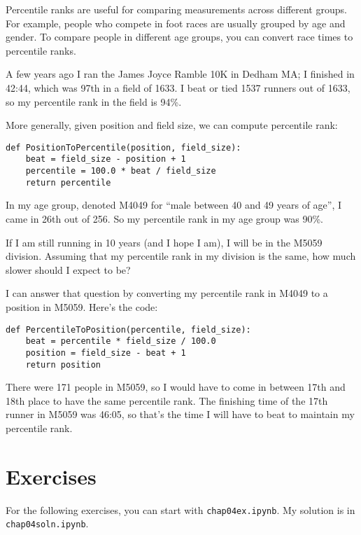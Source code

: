 Percentile ranks are useful for comparing measurements across
different groups.  For example, people who compete in foot races are
usually grouped by age and gender.  To compare people in different
age groups, you can convert race times to percentile ranks.

A few years ago I ran the James Joyce Ramble 10K in
Dedham MA; I finished in 42:44, which was 97th in a field of 1633.  I beat or
tied 1537 runners out of 1633, so my percentile rank in the field is
94\%.   

More generally, given position and field size, we can compute
percentile rank:

\begin{verbatim}
def PositionToPercentile(position, field_size):
    beat = field_size - position + 1
    percentile = 100.0 * beat / field_size
    return percentile
\end{verbatim}

In my age group, denoted M4049 for ``male between 40 and 49 years of
age'', I came in 26th out of 256.  So my percentile rank in my age
group was 90\%.

If I am still running in 10 years (and I hope I am), I will be in
the M5059 division.  Assuming that my percentile rank in my division
is the same, how much slower should I expect to be?

I can answer that question by converting my percentile rank in M4049
to a position in M5059.  Here's the code:

\begin{verbatim}
def PercentileToPosition(percentile, field_size):
    beat = percentile * field_size / 100.0
    position = field_size - beat + 1
    return position
\end{verbatim}

There were 171 people in M5059, so I would have to come in between
17th and 18th place to have the same percentile rank.  The finishing
time of the 17th runner in M5059 was 46:05, so that's the time I will
have to beat to maintain my percentile rank.


\section{Exercises}

For the following exercises, you can start with \verb"chap04ex.ipynb".
My solution is in \verb"chap04soln.ipynb".

